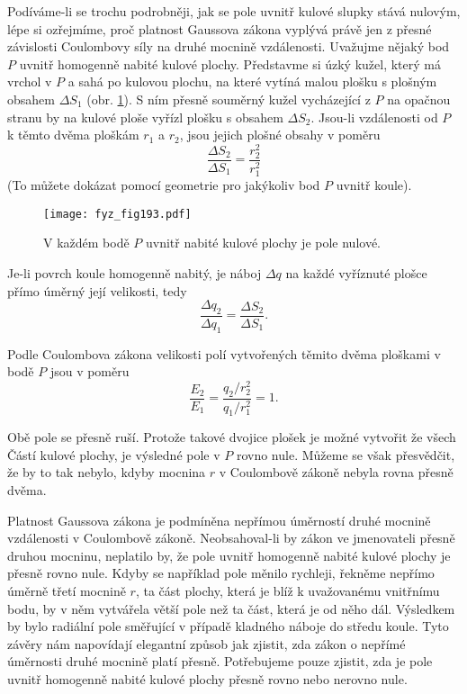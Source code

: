   Podíváme-li se trochu podrobněji, jak se pole uvnitř kulové slupky stává nulovým, lépe si
  ozřejmíme, proč platnost Gaussova zákona vyplývá právě jen z přesné závislosti Coulombovy síly na
  druhé mocnině vzdálenosti. Uvažujme nějaký bod \(P\) uvnitř homogenně nabité kulové plochy.
  Představme si úzký kužel, který má vrchol v \(P\) a sahá po kulovou plochu, na které vytíná malou
  plošku s plošným obsahem \(\Delta S_1\) (obr. \ref{fyz:fig193}). S ním přesně souměrný kužel
  vycházející z \(P\) na opačnou stranu by na kulové ploše vyřízl plošku s obsahem \(\Delta S_2\).
  Jsou-li vzdálenosti od \(P\) k těmto dvěma ploškám \(r_1\) a \(r_2\), jsou jejich plošné obsahy v
  poměru \[\frac{\Delta S_2}{\Delta S_1} = \frac{r_2^2}{r_1^2}\] (To můžete dokázat pomocí geometrie
  pro jakýkoliv bod \(P\) uvnitř koule).

  \begin{figure}[ht!] %
    \centering
    \texttt{[image: fyz\_fig193.pdf]}
    \caption{V každém bodě \(P\) uvnitř nabité kulové plochy je pole nulové.}
    \label{fyz:fig193}
  \end{figure}
  Je-li povrch koule homogenně nabitý, je náboj \(\Delta q\) na každé vyříznuté plošce přímo úměrný
  její velikosti, tedy \[\frac{\Delta q_2}{\Delta q_1} = \frac{\Delta S_2}{\Delta S_1}.\]
  
  Podle Coulombova zákona velikosti polí vytvořených těmito dvěma ploškami v bodě \(P\) jsou v
  poměru \[\frac{E_2}{E_1} = \frac{q_2/r_2^2}{q_1/r_1^2} = 1.\]
  
  Obě pole se přesně ruší. Protože takové dvojice plošek je možné vytvořit že všech Částí kulové
  plochy, je výsledné pole v \(P\) rovno nule. Můžeme se však přesvědčit, že by to tak nebylo, kdyby
  mocnina \(r\) v Coulombově zákoně nebyla rovna přesně dvěma.
  
  Platnost Gaussova zákona je podmíněna nepřímou úměrností druhé mocnině vzdálenosti v Coulombově
  zákoně. Neob\-sahoval-li by zákon ve jmenovateli přesně druhou mocninu, neplatilo by, že pole
  uvnitř homogenně nabité kulové plochy je přesně rovno nule. Kdyby se například pole měnilo
  rychleji, řekněme nepřímo úměrně třetí mocnině \(r\), ta část plochy, která je blíž k uvažovanému
  vnitřnímu bodu, by v něm vytvářela větší pole než ta část, která je od něho dál. Výsledkem by bylo
  radiální pole směřující v případě kladného náboje do středu koule. Tyto závěry nám napovídají
  elegantní způsob jak zjistit, zda zákon o nepřímé úměrnosti druhé mocnině platí přesně.
  Potřebujeme pouze zjistit, zda je pole uvnitř homogenně nabité kulové plochy přesně rovno nebo
  nerovno nule.
  
